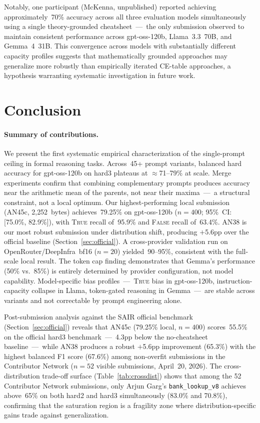 \documentclass[11pt]{article}
\begin{document}
Notably, one participant (McKenna, unpublished) reported achieving
approximately~70\% accuracy across all three evaluation models
simultaneously using a single theory-grounded cheatsheet~---~the only
submission observed to maintain consistent performance across
gpt-oss-120b, Llama~3.3~70B, and Gemma~4~31B. This convergence across
models with substantially different capacity profiles suggests that
mathematically grounded approaches may generalize more robustly than
empirically iterated CE-table approaches, a hypothesis warranting
systematic investigation in future work.

\section{Conclusion}
\label{sec:conclusion}

\paragraph{Summary of contributions.}
We present the first systematic empirical characterization of the
single-prompt ceiling in formal reasoning tasks. Across~45+ prompt
variants, balanced hard accuracy for gpt-oss-120b on hard3 plateaus at
$\approx$71--79\% at scale. Merge experiments confirm that combining
complementary prompts produces accuracy near the arithmetic mean of the
parents, not near their maxima~---~a structural constraint, not a local
optimum. Our highest-performing local submission (AN45c, 2{,}252~bytes)
achieves~79.25\% on gpt-oss-120b ($n=400$; 95\%~CI: [75.0\%, 82.9\%]),
with \textsc{True} recall of~95.9\% and \textsc{False} recall of~63.4\%.
AN38 is our most robust submission under distribution shift, producing
$+$5.6pp over the official baseline (Section~\ref{sec:official}). A
cross-provider validation run on OpenRouter/DeepInfra~bf16 ($n=20$)
yielded~90--95\%, consistent with the full-scale local result. The token
cap finding demonstrates that Gemma's performance (50\% vs.~85\%) is
entirely determined by provider configuration, not model capability.
Model-specific bias profiles~---~\textsc{True} bias in gpt-oss-120b,
instruction-capacity collapse in Llama, token-gated reasoning in
Gemma~---~are stable across variants and not correctable by prompt
engineering alone.

Post-submission analysis against the SAIR official benchmark
(Section~\ref{sec:official}) reveals that AN45c (79.25\% local,
$n=400$) scores~55.5\% on the official hard3 benchmark~---~4.3pp below
the no-cheatsheet baseline~---~while AN38 produces a robust $+$5.6pp
improvement (65.3\%) with the highest balanced F1 score (67.6\%) among
non-overfit submissions in the Contributor Network ($n=52$ visible
submissions, April~20, 2026). The cross-distribution trade-off surface
(Table~\ref{tab:crossdist}) shows that among the 52 Contributor Network
submissions, only Arjun Garg's \texttt{bank\_lookup\_v8} achieves above~65\%
on both hard2 and hard3 simultaneously (83.0\% and 70.8\%), confirming
that the saturation
region is a fragility zone where distribution-specific gains trade
against generalization.
\end{document}
